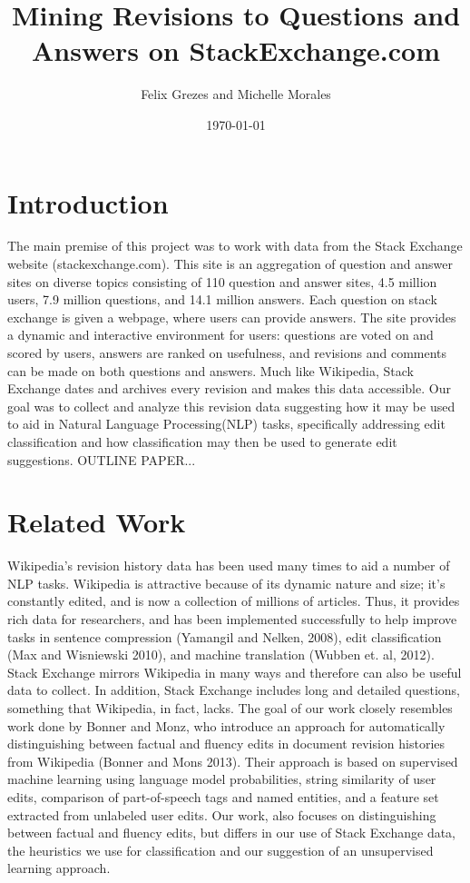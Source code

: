 \documentclass[11pt, oneside]{article}   	%
\title{Mining Revisions to Questions and Answers on StackExchange.com}
\author{Felix Grezes and Michelle Morales}
\date{\today}							%
\begin{document}
\maketitle

\section{Introduction}
The main premise of this project was to work with data from the Stack Exchange website (stackexchange.com). This site is an aggregation of question and answer sites on diverse topics consisting of 110 question and answer sites, 4.5 million users, 7.9 million questions, and 14.1 million answers. Each question on stack exchange is given a webpage, where users can provide answers. The site provides a dynamic and interactive environment for users: questions are voted on and scored by users, answers are ranked on usefulness, and revisions and comments can be made on both questions and answers. Much like Wikipedia, Stack Exchange dates and archives every revision and makes this data accessible. Our goal was to collect and analyze this revision data suggesting how it may be used to aid in Natural Language Processing(NLP) tasks, specifically addressing edit classification and how classification may then be used to generate edit suggestions. OUTLINE PAPER...

\section{Related Work}
Wikipedia's revision history data has been used many times to aid a number of NLP tasks. Wikipedia is attractive because of its dynamic nature and size; it's constantly edited, and is now a collection of millions of articles. Thus, it provides rich data for researchers, and has been implemented successfully to help improve tasks in sentence compression (Yamangil and Nelken, 2008), edit classification (Max and Wisniewski 2010),  and machine translation (Wubben et. al, 2012). Stack Exchange mirrors Wikipedia in many ways and therefore can also be useful data to collect. In addition, Stack Exchange includes long and detailed questions, something that Wikipedia, in fact, lacks. The goal of our work closely resembles work done by Bonner and Monz, who introduce an approach for automatically distinguishing between factual and fluency edits in document revision histories from Wikipedia (Bonner and Mons 2013). Their approach is based on supervised machine learning using language model probabilities, string similarity of user edits, comparison of part-of-speech tags and named entities, and a feature set extracted from unlabeled user edits. Our work, also focuses on distinguishing between factual and fluency edits, but differs in our use of Stack Exchange data, the heuristics we use for classification and our suggestion of an unsupervised learning approach. 
\end{document}
